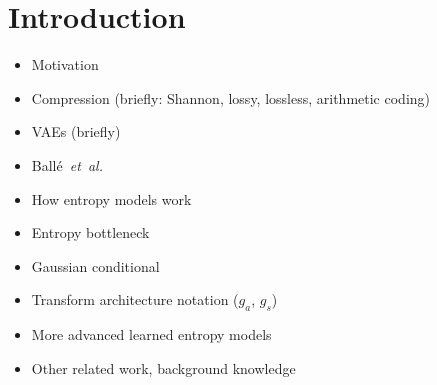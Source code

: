 \chapter{Introduction}
\label{ch:introduction}


\begin{itemize}
  \item Motivation
  \item Compression (briefly: Shannon, lossy, lossless, arithmetic coding)
  \item VAEs (briefly)
  \item Ballé~\emph{et~al.}~\cite{balle2018variational}
  \item How entropy models work
  \item Entropy bottleneck
  \item Gaussian conditional
  \item Transform architecture notation ($g_a$, $g_s$)
  \item More advanced learned entropy models
  \item Other related work, background knowledge
\end{itemize}

